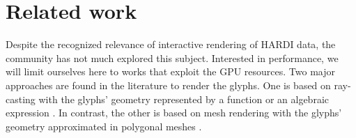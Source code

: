 \documentclass[twoside,twocolumn,10pt]{article}
\begin{document}

\section{Related work}
\label{sec::related_work}



 Despite the recognized relevance of interactive rendering of HARDI data, the community has not much explored this subject. Interested in performance, we will limit ourselves here to works that exploit the GPU resources. Two major approaches are found in the literature to render the glyphs. One is based on ray-casting with the glyphs' geometry represented by a function or an algebraic expression \cite{peeters2009, almsick2011}. In contrast, the other is based on mesh rendering with the glyphs' geometry approximated in polygonal meshes \cite{shattuck2008}.
 
 
\end{document}
